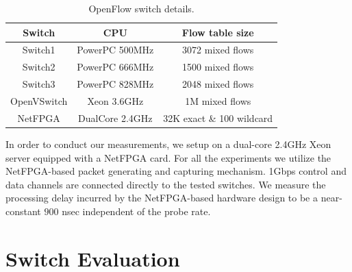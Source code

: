 \begin{table}[h!]
  \begin{center}
{
  \begin{tabular}{ |c | c | c | }
    \hline                        
    \textbf{Switch} & \textbf{CPU} & \textbf{Flow table size} \\
    \hline  
    Switch1 & PowerPC 500MHz & 3072 mixed flows \\
    \hline  
    Switch2 & PowerPC 666MHz & 1500 mixed flows \\
    \hline  
    Switch3 & PowerPC 828MHz & 2048 mixed flows \\
    \hline  
    OpenVSwitch & Xeon 3.6GHz & 1M mixed flows \\
    \hline  
    NetFPGA &  DualCore 2.4GHz & 32K exact \& 100 wildcard \\
    \hline 
  \end{tabular}  

}
\end{center}
\caption{OpenFlow switch details.}
\label{tbl:switch_list}
\end{table}

In order to conduct our measurements, we setup \oflops on a dual-core
2.4GHz Xeon server equipped with a NetFPGA card.
For all the experiments we utilize the NetFPGA-based packet generating and 
capturing mechanism. 1Gbps control and data channels are connected directly 
to the tested switches. We measure the processing delay incurred by the 
NetFPGA-based hardware design to be a near-constant $900$ nsec independent 
of the probe rate.

\section{Switch Evaluation}\label{sec:oflops-result}


